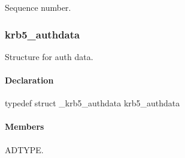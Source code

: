 \documentclass[letterpaper,10pt,english]{sphinxmanual}
\begin{document}

\begin{fulllineitems}
\label{appdev/refs/types/krb5_ap_rep_enc_part:c.krb5_ap_rep_enc_part.seq_number}
Sequence number.

\end{fulllineitems}



\subsubsection{krb5\_authdata}
\label{appdev/refs/types/krb5_authdata:krb5-authdata}\label{appdev/refs/types/krb5_authdata::doc}\label{appdev/refs/types/krb5_authdata:krb5-authdata-struct}

\begin{fulllineitems}
\label{appdev/refs/types/krb5_authdata:c.krb5_authdata}
\end{fulllineitems}


Structure for auth data.


\paragraph{Declaration}
\label{appdev/refs/types/krb5_authdata:declaration}
typedef struct \_krb5\_authdata  krb5\_authdata


\paragraph{Members}
\label{appdev/refs/types/krb5_authdata:members}

\begin{fulllineitems}
\label{appdev/refs/types/krb5_authdata:c.krb5_authdata.magic}
\end{fulllineitems}


\begin{fulllineitems}
\label{appdev/refs/types/krb5_authdata:c.krb5_authdata.ad_type}
ADTYPE.

\end{fulllineitems}
\end{document}
